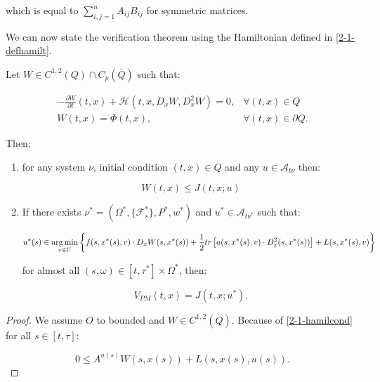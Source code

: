 which is equal to $\sum_{i,j=1}^n A_{ij}B_{ij}$ for symmetric matrices.

We can now state the verification theorem using the Hamiltonian defined in \ref{2-1-defhamilt}.

\begin{theorem}
    Let $W\in C^{1,2}(Q)\cap C_p(\overline{Q})$ such that:

    \begin{align}\label{2-1-hamilcond}
        -\frac{\partial W}{\partial t}(t,x) + \mathcal{H}(t,x,D_xW,D_x^2W) = 0, & \forall(t,x)\in Q \\
        W(t,x) = \Phi(t,x), & \forall(t,x)\in\partial Q.
    \end{align}

    Then:

    \begin{enumerate}
        \item for any system $\nu$, initial condition $(t,x)\in Q$ and any $u\in \mathcal{A}_{t\nu}$ then:
        
        \begin{equation}
            W(t,x) \leq J(t,x;u)
        \end{equation}

        \item If there exists $\nu^{\ast}=(\Omega^{\ast},\{\mathcal{F}_s^{\ast}\},P^{\ast},w^{\ast})$ and $u^{\ast}\in\mathcal{A}_{t\nu^{\ast}}$ such that:
        
        \begin{equation}
            u^{\ast}(s) \in \operatorname*{arg\,min}_{v\in U}\left\{f(s,x^{\ast}(s),v)\cdot D_xW(s,x^{\ast}(s)) + \frac{1}{2}tr\left[a(s,x^{\ast}(s),v)\cdot D_x^2(s,x^{\ast}(s))\right] + L(s,x^{\ast}(s),v)\right\}
        \end{equation}

        for almost all $(s,\omega)\in[t,\tau^{\ast}]\times\Omega^{\ast}$, then:

        \begin{equation}
            V_{PM}(t,x) = J(t,x;u^{\ast}).
        \end{equation}
    \end{enumerate}

    \begin{proof}
        We assume $O$ to bounded and $W\in C^{1,2}(\overline{Q})$. Because of \ref{2-1-hamilcond} for all $s\in[t,\tau]$:

        \begin{equation}\label{2-1-proofver-keyeq}
            0\leq A^{u(s)}W(s,x(s)) + L(s,x(s),u(s)).
        \end{equation}


\end{proof}
\end{theorem}
